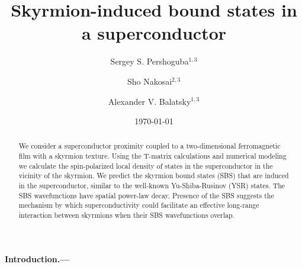 \documentclass[twocolumn,showpacs,floatfix,longbibliography]{revtex4-1}
\begin{document}
\title{Skyrmion-induced bound states in a superconductor}

\author{Sergey S. Pershoguba$^{1,3}$}
\author{Sho Nakosai$^{2,3}$}
\author{Alexander V. Balatsky$^{1,3}$}



\date{\today}


\begin{abstract}
We consider a superconductor proximity coupled to a two-dimensional ferromagnetic film with a skyrmion texture. Using the T-matrix calculations and numerical modeling we calculate the spin-polarized local density of states in the superconductor in the vicinity of the skyrmion. We predict the skyrmion bound states (SBS) that are induced in the superconductor, similar to the well-known Yu-Shiba-Rusinov (YSR) states. The SBS wavefunctions have spatial power-law decay. Presence of the SBS suggests the mechanism by which superconductivity could facilitate an effective long-range interaction between skyrmions when their SBS wavefunctions overlap.
\end{abstract}





\maketitle
\paragraph*{Introduction.---} \label{sec:intro}
\end{document}
